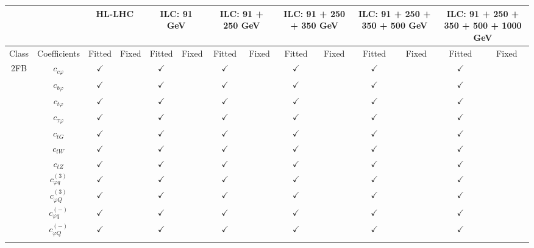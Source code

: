 \documentclass{article}
\begin{document}
\begin{table}[H]
\centering
\begin{tabular}{|c|c|c|c|c|c|c|c|c|c|c|c|c|c|}
\hline
 &  & \multicolumn{2}{c|}{HL-LHC} & \multicolumn{2}{c|}{ILC: 91 GeV} & \multicolumn{2}{c|}{ILC: 91 + 250 GeV} & \multicolumn{2}{c|}{ILC: 91 + 250 + 350 GeV} & \multicolumn{2}{c|}{ILC: 91 + 250 + 350 + 500 GeV} & \multicolumn{2}{c|}{ILC: 91 + 250 + 350 + 500 + 1000 GeV} \\ \hline
Class & Coefficients & Fitted & Fixed  & Fitted & Fixed  & Fitted & Fixed  & Fitted & Fixed  & Fitted & Fixed  & Fitted & Fixed  \\ \hline
\multirow{23}{*}{2FB}
 & $c_{c \varphi}$ & $\checkmark$ &  & $\checkmark$ &  & $\checkmark$ &  & $\checkmark$ &  & $\checkmark$ &  & $\checkmark$ & \\ \cline{2-14}
 & $c_{b \varphi}$ & $\checkmark$ &  & $\checkmark$ &  & $\checkmark$ &  & $\checkmark$ &  & $\checkmark$ &  & $\checkmark$ & \\ \cline{2-14}
 & $c_{t \varphi}$ & $\checkmark$ &  & $\checkmark$ &  & $\checkmark$ &  & $\checkmark$ &  & $\checkmark$ &  & $\checkmark$ & \\ \cline{2-14}
 & $c_{\tau \varphi}$ & $\checkmark$ &  & $\checkmark$ &  & $\checkmark$ &  & $\checkmark$ &  & $\checkmark$ &  & $\checkmark$ & \\ \cline{2-14}
 & $c_{tG}$ & $\checkmark$ &  & $\checkmark$ &  & $\checkmark$ &  & $\checkmark$ &  & $\checkmark$ &  & $\checkmark$ & \\ \cline{2-14}
 & $c_{tW}$ & $\checkmark$ &  & $\checkmark$ &  & $\checkmark$ &  & $\checkmark$ &  & $\checkmark$ &  & $\checkmark$ & \\ \cline{2-14}
 & $c_{tZ}$ & $\checkmark$ &  & $\checkmark$ &  & $\checkmark$ &  & $\checkmark$ &  & $\checkmark$ &  & $\checkmark$ & \\ \cline{2-14}
 & $c_{\varphi q}^{(3)}$ & $\checkmark$ &  & $\checkmark$ &  & $\checkmark$ &  & $\checkmark$ &  & $\checkmark$ &  & $\checkmark$ & \\ \cline{2-14}
 & $c_{\varphi Q}^{(3)}$ & $\checkmark$ &  & $\checkmark$ &  & $\checkmark$ &  & $\checkmark$ &  & $\checkmark$ &  & $\checkmark$ & \\ \cline{2-14}
 & $c_{\varphi q}^{(-)}$ & $\checkmark$ &  & $\checkmark$ &  & $\checkmark$ &  & $\checkmark$ &  & $\checkmark$ &  & $\checkmark$ & \\ \cline{2-14}
 & $c_{\varphi Q}^{(-)}$ & $\checkmark$ &  & $\checkmark$ &  & $\checkmark$ &  & $\checkmark$ &  & $\checkmark$ &  & $\checkmark$ & \\ \cline{2-14}

\end{tabular}
\end{table}
\end{document}

